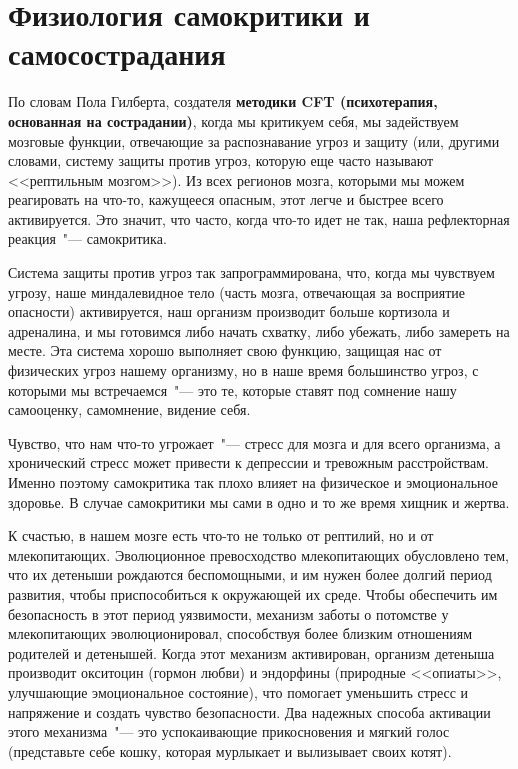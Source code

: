 
\chapter{Физиология самокритики и самосострадания} \label{The_Physiology_of_Self-Criticism_and_Self-Compassion}

По словам Пола Гилберта, создателя \textbf{методики CFT (психотерапия, основанная на сострадании)}, когда мы критикуем себя, мы задействуем мозговые функции, отвечающие за распознавание угроз и защиту (или, другими словами, систему защиты против угроз, которую еще часто называют <<рептильным мозгом>>)\cite{50}. Из всех регионов мозга, которыми мы можем реагировать на что-то, кажущееся опасным, этот легче и быстрее всего активируется. Это значит, что часто, когда что-то идет не так, наша рефлекторная реакция~"--- самокритика. 

Система защиты против угроз так запрограммирована, что, когда мы чувствуем угрозу, наше миндалевидное тело (часть мозга, отвечающая за восприятие опасности) активируется, наш организм производит больше кортизола и адреналина, и мы готовимся либо начать схватку, либо убежать, либо замереть на месте\cite{51}. Эта система хорошо выполняет свою функцию, защищая нас от физических угроз нашему организму, но в наше время большинство угроз, с которыми мы встречаемся~"--- это те, которые ставят под сомнение нашу самооценку, самомнение, видение себя. 

Чувство, что нам что-то угрожает~"--- стресс для мозга и для всего организма, а хронический стресс может привести к депрессии и тревожным расстройствам. Именно поэтому самокритика так плохо влияет на физическое и эмоциональное здоровье. В случае самокритики мы сами в одно и то же время хищник и жертва. 

К счастью, в нашем мозге есть что-то не только от рептилий, но и от млекопитающих. Эволюционное превосходство млекопитающих обусловлено тем, что их детеныши рождаются беспомощными, и им нужен более долгий период развития, чтобы приспособиться к окружающей их среде\cite{52}. Чтобы обеспечить им безопасность в этот период уязвимости, механизм заботы о потомстве у млекопитающих эволюционировал, способствуя более близким отношениям родителей и детенышей. Когда этот механизм активирован, организм детеныша производит окситоцин (гормон любви) и эндорфины (природные <<опиаты>>, улучшающие эмоциональное состояние), что помогает уменьшить стресс и напряжение и  создать чувство безопасности. Два надежных способа активации этого механизма~"--- это успокаивающие прикосновения и мягкий голос \cite{53} (представьте себе кошку, которая мурлыкает и вылизывает своих котят).  

